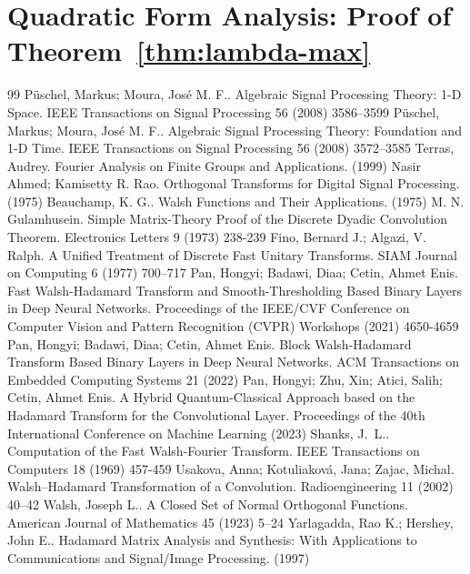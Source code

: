 \documentclass[10pt,a4paper]{amsart}
\begin{document}
\section{Quadratic Form Analysis: Proof of Theorem~\ref{thm:lambda-max}}
\label{app:quadratic-form}


\begin{thebibliography}{99}
 P{\"u}schel, Markus; Moura, Jos{\'e} M. F.. Algebraic Signal Processing Theory: 1-D Space. IEEE Transactions on Signal Processing 56 (2008) 3586--3599
 P{\"u}schel, Markus; Moura, Jos{\'e} M. F.. Algebraic Signal Processing Theory: Foundation and 1-D Time. IEEE Transactions on Signal Processing 56 (2008) 3572--3585
 Terras, Audrey. Fourier Analysis on Finite Groups and Applications. (1999)
 Nasir Ahmed; Kamisetty R. Rao. Orthogonal Transforms for Digital Signal Processing. (1975)
 Beauchamp, K. G.. Walsh Functions and Their Applications. (1975)
 M. N. Gulamhusein. Simple Matrix-Theory Proof of the Discrete Dyadic Convolution Theorem. Electronics Letters 9 (1973) 238-239
 Fino, Bernard J.; Algazi, V. Ralph. A Unified Treatment of Discrete Fast Unitary Transforms. SIAM Journal on Computing 6 (1977) 700--717
 Pan, Hongyi; Badawi, Diaa; Cetin, Ahmet Enis. Fast Walsh-Hadamard Transform and Smooth-Thresholding Based Binary Layers in Deep Neural Networks. Proceedings of the IEEE/CVF Conference on Computer Vision and Pattern Recognition (CVPR) Workshops (2021) 4650-4659
 Pan, Hongyi; Badawi, Diaa; Cetin, Ahmet Enis. Block Walsh-Hadamard Transform Based Binary Layers in Deep Neural Networks. ACM Transactions on Embedded Computing Systems 21 (2022)
 Pan, Hongyi; Zhu, Xin; Atici, Salih; Cetin, Ahmet Enis. A Hybrid Quantum-Classical Approach based on the Hadamard Transform for the Convolutional Layer. Proceedings of the 40th International Conference on Machine Learning (2023)
 Shanks, J.~L.. Computation of the Fast Walsh-Fourier Transform. IEEE Transactions on Computers 18 (1969) 457-459
 Usakova, Anna; Kotuliaková, Jana; Zajac, Michal. Walsh--Hadamard Transformation of a Convolution. Radioengineering 11 (2002) 40--42
 Walsh, Joseph L.. A Closed Set of Normal Orthogonal Functions. American Journal of Mathematics 45 (1923) 5--24
 Yarlagadda, Rao K.; Hershey, John E.. Hadamard Matrix Analysis and Synthesis: With Applications to Communications and Signal/Image Processing. (1997)
\end{thebibliography}
\end{document}
